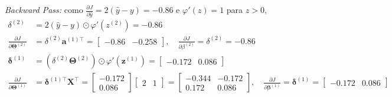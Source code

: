 \documentclass{dlproblemset}
\begin{document}
\begin{enumerate}[1)]
    \textit{Backward Pass:} como $\frac{\partial J}{\partial \hat{y}}=2(\hat{y}-y)=-0.86$ e $\varphi'(z)=1$ para $z>0$,
    \begin{align*}
        \delta^{(2)} &= 2(\hat{y}-y)\odot\varphi'(z^{(2)}) = -0.86\\
        \frac{\partial J}{\partial \mathbf{\Theta}^{(2)}} &= \delta^{(2)}\mathbf{a}^{(1)\top} = \begin{bmatrix}-0.86 & -0.258\end{bmatrix}, \quad \frac{\partial J}{\partial \beta^{(2)}} = \delta^{(2)} = -0.86\\
        \boldsymbol{\delta}^{(1)} &= (\delta^{(2)}\mathbf{\Theta}^{(2)})\odot\varphi'(\mathbf{z}^{(1)}) = \begin{bmatrix}-0.172 & 0.086\end{bmatrix}\\
        \frac{\partial J}{\partial \mathbf{\Theta}^{(1)}} &= \boldsymbol{\delta}^{(1)\top}\mathbf{X}^\top = \begin{bmatrix}-0.172\\ 0.086\end{bmatrix}\begin{bmatrix}2 & 1\end{bmatrix} = \begin{bmatrix}-0.344 & -0.172\\ 0.172 & 0.086\end{bmatrix}, \quad \frac{\partial J}{\partial \boldsymbol{\beta}^{(1)}} = \boldsymbol{\delta}^{(1)} = \begin{bmatrix}-0.172 & 0.086\end{bmatrix}
    \end{align*}


\end{enumerate}
\end{document}
